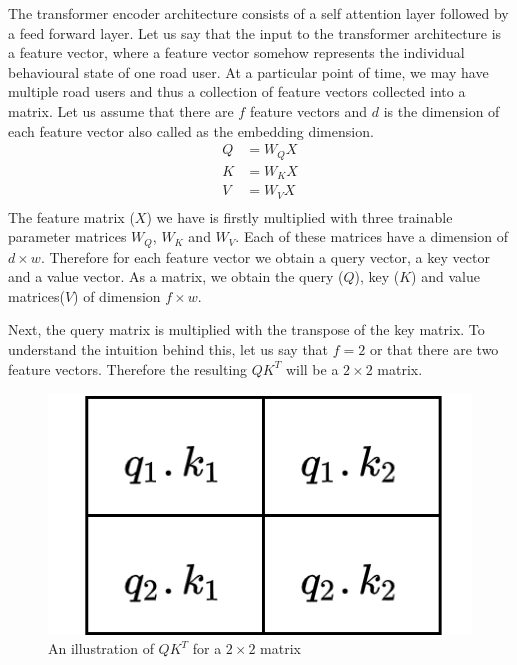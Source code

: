 \documentclass{article}
\begin{document}
The transformer encoder architecture consists of a self attention layer followed by a feed forward layer. Let us say that the input to the transformer architecture is a feature vector, where a feature vector somehow represents the individual behavioural state of one road user. At a particular point of time, we may have multiple road users and thus a collection of feature vectors collected into a matrix. Let us assume that there are $f$ feature vectors and $d$ is the dimension of each feature vector also called as the embedding dimension. 
\begin{equation}
    \begin{split}
        Q&=W_QX\\
        K&=W_KX\\
        V&=W_VX\\
    \end{split}
\end{equation}
The feature matrix ($X$) we have is firstly multiplied with three trainable parameter matrices $W_Q$, $W_K$ and $W_V$. Each of these matrices have a dimension of $d \times w$. Therefore for each feature vector we obtain a query vector, a key vector and a value vector. As a matrix, we obtain the query ($Q$), key ($K$) and value matrices($V$) of dimension $f \times w$. 

Next, the query matrix is multiplied with the transpose of the key matrix. To understand the intuition behind this, let us say that $f=2$ or that there are two feature vectors. Therefore the resulting $QK^T$ will be a $2 \times 2$ matrix. 
\begin{figure}[H]
\centering
\includegraphics[scale=0.4]{theory/example.png}
\caption{An illustration of $QK^T$ for a $2 \times 2$ matrix}
\label{fig:transformer-example}
\end{figure}
\end{document}
